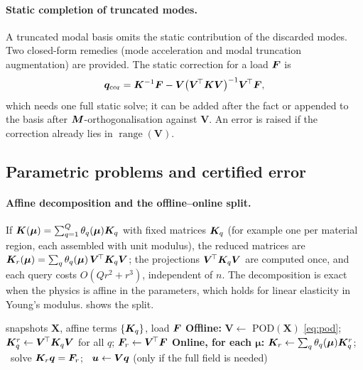 \paragraph{Static completion of truncated modes.}
A truncated modal basis omits the static contribution of the discarded modes. Two closed-form remedies (mode acceleration and modal truncation augmentation) \cite{besselink2013comparison} are provided. The static correction for a load $\bm{F}$ is
\begin{equation}
  \bm q_{\mathrm{cor}}=\bm{K}^{-1}\bm{F}-\bm V\bigl(\bm V^{\!\top}\bm{K}\bm V\bigr)^{-1}\bm V^{\!\top}\bm{F},
  \label{eq:modeacc}
\end{equation}
which needs one full static solve; it can be added after the fact or appended to the basis after $\bm{M}$-orthogonalisation against $\bm V$. An error is raised if the correction already lies in $\operatorname{range}(\bm V)$.

\subsection{Parametric problems and certified error}\label{sec:rom:param}
\paragraph{Affine decomposition and the offline--online split.}
If $\bm{K}(\bm\mu)=\sum_{q=1}^{Q}\theta_q(\bm\mu)\bm{K}_q$ with fixed matrices $\bm{K}_q$ (for example one per material region, each assembled with unit modulus), the reduced matrices are
$\bm{K}_r(\bm\mu)=\sum_q\theta_q(\bm\mu)\,\bm V^{\!\top}\bm{K}_q\bm V$; the projections $\bm V^{\!\top}\bm{K}_q\bm V$ are computed once, and each query costs $O(Qr^2+r^3)$, independent of $n$. The decomposition is exact when the physics is affine in the parameters, which holds for linear elasticity in Young's modulus.
 shows the split.

\begin{algorithm}[t]
\caption{Offline--online reduced-basis solve with affine parameters}\label{alg:offline}
\begin{algorithmic}[1]
\Require snapshots $\bm X$, affine terms $\{\bm{K}_q\}$, load $\bm{F}$
\State \textbf{Offline:} $\bm V\gets$ POD$(\bm X)$ \eqref{eq:pod}; $\bm{K}_q^r\gets\bm V^{\!\top}\bm{K}_q\bm V$ for all $q$; $\bm{F}_r\gets\bm V^{\!\top}\bm{F}$
\State \textbf{Online, for each $\bm\mu$:}
\State \quad $\bm{K}_r\gets\sum_q\theta_q(\bm\mu)\bm{K}_q^r$; \ solve $\bm{K}_r\bm q=\bm{F}_r$; \ $\bm{u}\gets\bm V\bm q$ (only if the full field is needed)
\end{algorithmic}
\end{algorithm}

